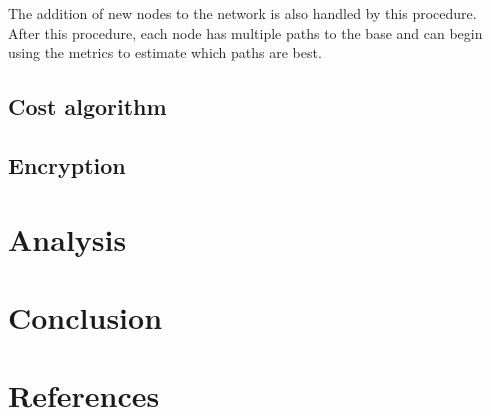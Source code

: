 \documentclass[letterpaper]{article}
\begin{document}
\noindent The addition of new nodes to the network is also handled by this procedure. After this procedure, 
each node has multiple paths to the base and can begin using the metrics to estimate which paths are best.


\subsection{Cost algorithm}

\subsection{Encryption}

\section{Analysis}

\section{Conclusion}

\section{References}
\end{document}
